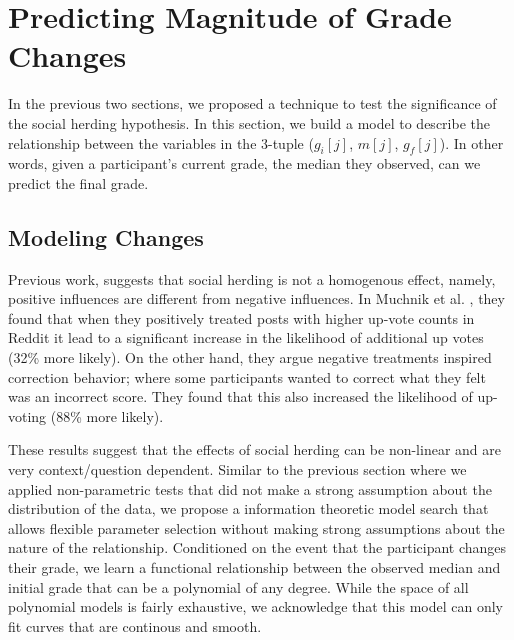 \section{Predicting Magnitude of Grade Changes}
\label{changemod}
In the previous two sections, we proposed a technique to test the significance of the social herding hypothesis.
In this section, we build a model to describe the relationship between the variables in the 3-tuple ($g_i[j]$, $m[j]$, $g_f[j]$).
In other words, given a participant's current grade, the median they observed, can we predict the final grade.

\subsection{Modeling Changes}
Previous work, suggests that social herding is not a homogenous effect, namely, positive influences are different from negative influences.
In Muchnik et al. \cite{muchnik2013social}, they found that when they positively treated posts with higher up-vote counts in Reddit it lead to a significant increase in the likelihood of additional up votes (32\% more likely). 
On the other hand, they argue negative treatments inspired correction behavior; where some participants wanted to correct what they felt was an incorrect score. 
They found that this also increased the likelihood of up-voting (88\% more likely).

These results suggest that the effects of social herding can be non-linear and are very context/question dependent.
Similar to the previous section where we applied non-parametric tests that did not make a strong assumption about the distribution of the data, we propose a information theoretic model search that allows flexible parameter selection without making strong assumptions about the nature of the relationship.
Conditioned on the event that the participant changes their grade, we learn a functional relationship between the observed median and initial grade that can be a polynomial of any degree.
While the space of all polynomial models is fairly exhaustive, we acknowledge that this model can only fit curves that are continous and smooth.

